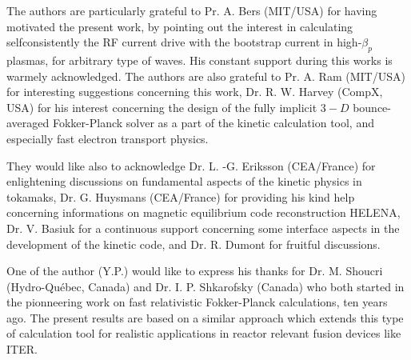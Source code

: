 

The authors are particularly grateful to Pr. A. Bers (MIT/USA) for having
motivated the present work, by pointing out the interest in calculating
selfconsistently the RF current drive with the bootstrap current in high-$%
\beta _{p}$ plasmas, for arbitrary type of waves. His constant support
during this works is warmely acknowledged. The authors are also grateful to
Pr. A. Ram (MIT/USA) for interesting suggestions concerning this work, Dr.
R. W. Harvey (CompX, USA) for his interest concerning the design of the
fully implicit $3-D$ bounce-averaged Fokker-Planck solver as a part of the
kinetic calculation tool, and especially fast electron transport physics.

They would like also to acknowledge Dr. L. -G. Eriksson (CEA/France) for
enlightening discussions on fundamental aspects of the kinetic physics in
tokamaks, Dr. G. Huysmans (CEA/France) for providing his kind help
concerning informations on magnetic equilibrium code reconstruction HELENA,
Dr. V. Basiuk for a continuous support concerning some interface aspects in
the development of the kinetic code, and Dr. R. Dumont for fruitful
discussions.

One of the author (Y.P.) would like to express his thanks for Dr. M. Shoucri
(Hydro-Qu\'{e}bec, Canada) and Dr. I. P. Shkarofsky (Canada) who both
started in the pionneering work on fast relativistic Fokker-Planck
calculations, ten years ago. The present results are based on a similar
approach which extends this type of calculation tool for realistic
applications in reactor relevant fusion devices like ITER.
